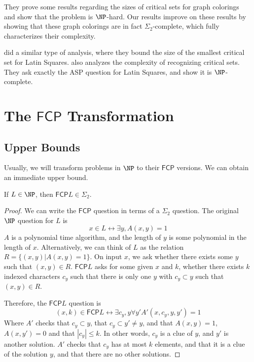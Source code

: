 \documentclass[runningheads,a4paper]{llncs}
\begin{document}
They prove some results regarding the sizes of critical sets for graph colorings and show that the problem is $\NP$-hard. Our results improve on these results by showing that these graph colorings are in fact $\Sigma_2$-complete, which fully characterizes their complexity.

\cite{Ghandehari2005121} did a similar type of analysis, where they bound the size of the smallest critical set for Latin Squares. \cite{colbourn1984computational} also analyzes the complexity of recognizing critical sets. They ask exactly the ASP question for Latin Squares, and show it is $\NP$-complete.


\section{The $\mathsf{FCP}$ Transformation}
\label{sec:prelim}

\subsection{Upper Bounds}

Usually, we will transform problems in $\NP$ to their $\mathsf{FCP}$ versions. We can obtain an immediate upper bound.

\begin{theorem}
\label{thm:satinsig2}
If $L \in \NP$, then $\mathsf{FCP} L \in \Sigma_2$. 
\end{theorem}

\begin{proof}
We can write the $\mathsf{FCP}$ question in terms of a $\Sigma_2$ question. The original $\NP$ question for $L$ is
\[ x \in L \leftrightarrow \exists y, A(x, y) = 1 \]
$A$ is a polynomial time algorithm, and the length of $y$ is some polynomial in the length of $x$. Alternatively, we can think of $L$ as the relation $R = \{ (x, y) | A(x,y) = 1 \}$. On input $x$, we ask whether there exists some $y$ such that $(x, y) \in R$. $\mathsf{FCP} L$ asks for some given $x$ and $k$, whether there exists $k$ indexed characters $c_y$ such that there is only one $y$ with $c_y \subset y$ such that $(x,y) \in R$. 

Therefore, the $\mathsf{FCP} L$ question is
\[ (x, k) \in \mathsf{FCP} L \leftrightarrow \exists c_y, y \forall y' A'(x, c_y, y, y') = 1 \]
Where $A'$ checks that $c_y \subset y$, that $c_y \subset y' \neq y$, and that $A(x,y) = 1$, $A(x, y') = 0$ and that $|c_y| \leq k$. In other words, $c_y$ is a clue of $y$, and $y'$ is another solution. $A'$ checks that $c_y$ has at most $k$ elements, and that it is a clue of the solution $y$, and that there are no other solutions. 
\end{proof}
\end{document}

